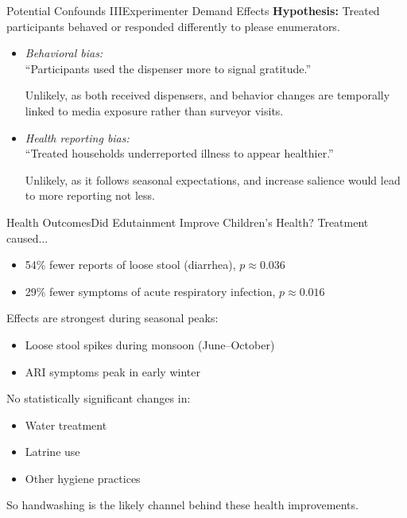 \documentclass[aspectratio=169]{beamer}
\begin{document}
\begin{frame}{Potential Confounds III}{Experimenter Demand Effects}
	\textbf{Hypothesis:} Treated participants behaved or responded differently to please enumerators.

	\begin{itemize}
		\item \textit{Behavioral bias:}\\``Participants used the dispenser more to signal gratitude.''

			Unlikely, as both received dispensers, and behavior changes are temporally linked to media exposure rather than surveyor visits.

		\item \textit{Health reporting bias:}\\``Treated households underreported illness to appear healthier.''

			Unlikely, as it follows seasonal expectations, and increase salience would lead to more reporting not less.
	\end{itemize}
\end{frame}

\begin{frame}{Health Outcomes}{Did Edutainment Improve Children's Health?}
	Treatment caused...
	\begin{itemize}
		\item 54\% fewer reports of loose stool (diarrhea), $p \approx 0.036$
		\item 29\% fewer symptoms of acute respiratory infection, $p \approx 0.016$
	\end{itemize}


	Effects are strongest during seasonal peaks:
	\begin{itemize}
		\item Loose stool spikes during monsoon (June–October)
		\item ARI symptoms peak in early winter
	\end{itemize}


	No statistically significant changes in:
	\begin{itemize}
		\item Water treatment
		\item Latrine use
		\item Other hygiene practices
	\end{itemize}

	So handwashing is the likely channel behind these health improvements.
\end{frame}
\end{document}
